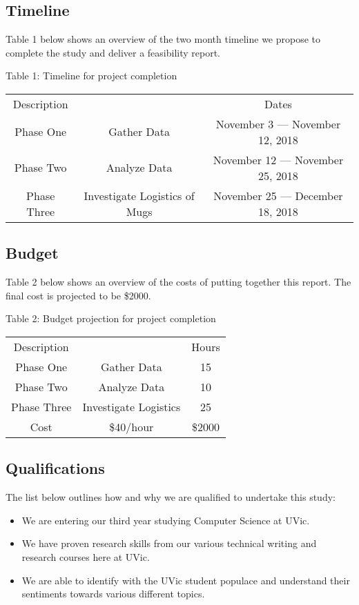 \documentclass[letterpaper,11pt]{texMemo}
\begin{document}
\subsection*{Timeline}
Table 1 below shows an overview of the two month timeline we propose to
complete the study and deliver a feasibility report.
\begin{center}
	Table 1: Timeline for project completion
	\begin{tabular}{ccc}
		\toprule
		Description && Dates \\
		Phase One & Gather Data & November 3 --- November 12, 2018 \\
		Phase Two & Analyze Data & November 12 --- November 25, 2018 \\
		Phase Three & Investigate Logistics of Mugs & November 25 --- December 18, 2018 \\
		\bottomrule
	\end{tabular}
\end{center}
\subsection*{Budget}
Table 2 below shows an overview of the costs of putting together this report.
The final cost is projected to be \$2000.
\begin{center}
	Table 2: Budget projection for project completion\\
	\begin{tabular}{ccc}
		\toprule
		Description && Hours \\
		Phase One & Gather Data & 15 \\
		Phase Two & Analyze Data & 10 \\
		Phase Three & Investigate Logistics & 25 \\
		Cost & \$40/hour & \$2000 \\
		\bottomrule
	\end{tabular}
\end{center}

\subsection*{Qualifications}
	The list below outlines how and why we are qualified to undertake this study:
	\begin{itemize}
		\item We are entering our third year studying Computer Science at UVic.
		\item We have proven research skills from our various technical writing
			and research courses here at UVic.
		\item We are able to identify with the UVic student populace and
			understand their sentiments towards various different topics.
	\end{itemize}
\end{document}
